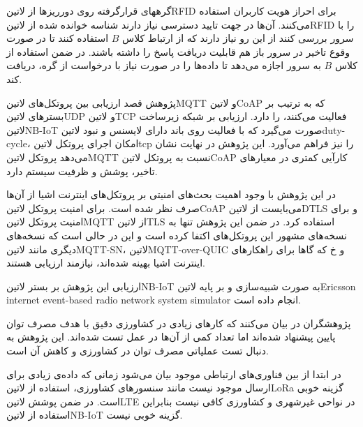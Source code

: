 گرههای قرارگرفته روی دورریزها از ‌لاتین{RFID} برای احراز هویت کاربران استفاده می‌کنند. آن‌ها در جهت تایید دسترسی نیاز دارند شناسه خوانده شده از ‌لاتین{RFID} را با سرور بررسی کنند
از این رو نیاز دارند که از ارتباط کلاس $B$ استفاده کنند تا در صورت وقوع تاخیر در سرور باز هم قابلیت دریافت پاسخ را داشته باشند. در ضمن استفاده از کلاس $B$ به سرور اجازه می‌دهد تا داده‌ها را
در صورت نیاز با درخواست از گره، دریافت کند.



پژوهش  قصد ارزیابی بین پروتکل‌های ‌لاتین{MQTT} و ‌لاتین{CoAP} که به ترتیب بر بسترهای ‌لاتین{UDP} و ‌لاتین{TCP} فعالیت می‌کنند، را دارد.
ارزیابی بر شبکه زیرساخت ‌لاتین{NB-IoT} صورت می‌گیرد که با فعالیت روی باند دارای لایسنس و نبود ‌لاتین{duty-cycle}، امکان اجرای پروتکل ‌لاتین{tcp} را نیز فراهم می‌آورد.
این پژوهش در نهایت نشان می‌دهد پروتکل ‌لاتین{MQTT} نسبت به پروتکل ‌لاتین{CoAP} کارآیی کمتری در معیارهای تاخیر، پوشش و ظرفیت سیستم دارد.

در این پژوهش با وجود اهمیت بحث‌های امنیتی بر پروتکل‌های اینترنت اشیا از آن‌ها صرف نظر شده است. برای امنیت پروتکل ‌لاتین{CoAP} می‌بایست از ‌لاتین{DTLS} و
برای امنیت پروتکل ‌لاتین{MQTT} از ‌لاتین{TLS} استفاده کرد.
در ضمن این پژوهش تنها به نسخه‌های مشهور این پروتکل‌های اکتفا کرده است و این در حالی است که نسخه‌های دیگری مانند ‌لاتین{MQTT-SN}، ‌لاتین{MQTT-over-QUIC} و ‌خ
که گاها برای راهکارهای اینترنت اشیا بهینه شده‌اند، نیازمند ارزیابی هستند.

ارزیابی این پژوهش بر بستر ‌لاتین{NB-IoT} به صورت شبیه‌سازی و بر پایه ‌لاتین{Ericsson internet event-based radio network system simulator} انجام داده است.



پژوهشگران در  بیان می‌کنند که کارهای زیادی در کشاورزی دقیق با هدف مصرف توان پایین پیشنهاد شده‌اند اما تعداد کمی از آن‌ها در عمل تست شده‌اند.
این پژوهش به دنبال تست عملیاتی مصرف توان در کشاورزی و کاهش آن است.

در ابتدا از بین فناوری‌های ارتباطی موجود بیان می‌شود زمانی که داده‌ی زیادی برای ارسال موجود نیست مانند سنسورهای کشاورزی، استفاده از ‌لاتین{LoRa} گزینه خوبی است.
در ضمن پوشش ‌لاتین{LTE} در نواحی غیرشهری و کشاورزی کافی نیست بنابراین استفاده از ‌لاتین{NB-IoT} گزینه خوبی نیست.

